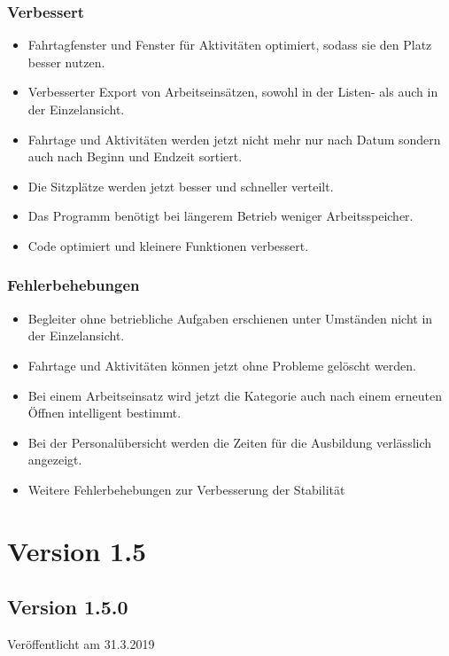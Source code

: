\subsubsection{Verbessert}
\begin{itemize}
  \item
  Fahrtagfenster und Fenster für Aktivitäten optimiert, sodass sie den Platz besser nutzen.
  \item
  Verbesserter Export von Arbeitseinsätzen, sowohl in der Listen- als auch in der Einzelansicht.
  \item
  Fahrtage und Aktivitäten werden jetzt nicht mehr nur nach Datum sondern auch nach Beginn und Endzeit sortiert.
  \item
  Die Sitzplätze werden jetzt besser und schneller verteilt.
  \item
  Das Programm benötigt bei längerem Betrieb weniger Arbeitsspeicher.
  \item
  Code optimiert und kleinere Funktionen verbessert.
\end{itemize}

\subsubsection{Fehlerbehebungen}
\begin{itemize}
  \item
  Begleiter ohne betriebliche Aufgaben erschienen unter Umständen nicht in der Einzelansicht.
  \item
  Fahrtage und Aktivitäten können jetzt ohne Probleme gelöscht werden.
  \item
  Bei einem Arbeitseinsatz wird jetzt die Kategorie auch nach einem erneuten Öffnen intelligent bestimmt.
  \item
  Bei der Personalübersicht werden die Zeiten für die Ausbildung verlässlich angezeigt.
  \item
  Weitere Fehlerbehebungen zur Verbesserung der Stabilität
\end{itemize}



\section{Version 1.5}
\subsection{Version 1.5.0}
Veröffentlicht am 31.3.2019
